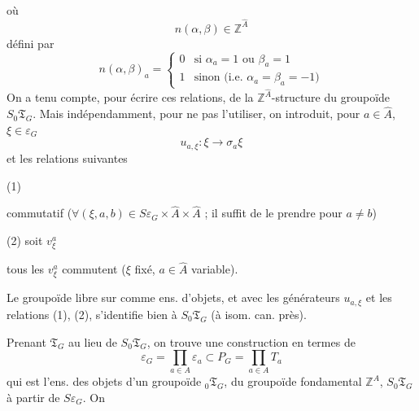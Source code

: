 \documentclass[11pt,a4paper]{article}
\begin{document}

où
\[
n(\alpha,\beta) \in \mathbb{Z}^{\hat{A}}
\]
défini par 
\[
n(\alpha,\beta)_a =
\begin{cases}
0 & \text{si } \alpha_a = 1 \text{ ou } \beta_a = 1 \\
1 & \text{sinon (i.e. } \alpha_a = \beta_a = -1)
\end{cases}
\]
On  a tenu compte, pour écrire ces relations,  de la
$\mathbb{Z}^{\hat{A}}$-structure du groupoïde $S_0\mathfrak{T}_G$. Mais
indépendamment, pour ne pas l'utiliser, on introduit, pour $a \in \hat{A}$,
$\xi \in \varepsilon_G$
\[
u_{a,\xi} : \xi \longrightarrow \sigma_a \xi
\]
et les relations suivantes

(1)


commutatif ($\forall (\xi, a, b) \in S\varepsilon_G \times \hat{A} \times \hat{A}$ ;
il suffit de le prendre pour $a \neq b$)

(2)  soit $v^a_\xi$ 


tous les $v^a_\xi$ commutent ($\xi$ fixé, $a \in \hat{A}$ variable).

Le groupoïde libre sur   comme ens.
d'objets, et avec les générateurs $u_{a,\xi}$ et les relations (1), (2),
 s'identifie bien à $S_0\mathfrak{T}_G$ (à isom. can. près).

Prenant $\mathfrak{T}_G$ au  lieu de $S_0\mathfrak{T}_G$, on
trouve une construction \struck{\ill{}}  en termes de
\[
\varepsilon_G = \prod_{a \in A} \varepsilon_a \subset P_G = \prod_{a \in A} T_a
\]
qui est l'ens. des objets d'un groupoïde \add{\ill{}} ${}_0\mathfrak{T}_G$,
\struck{\ill{}} du groupoïde fondamental \struck{\ill{}}
$\mathbb{Z}^{A}$, \ill{}
 $S_0\mathfrak{T}_G$ à partir de $S\varepsilon_G$. On
\end{document}
